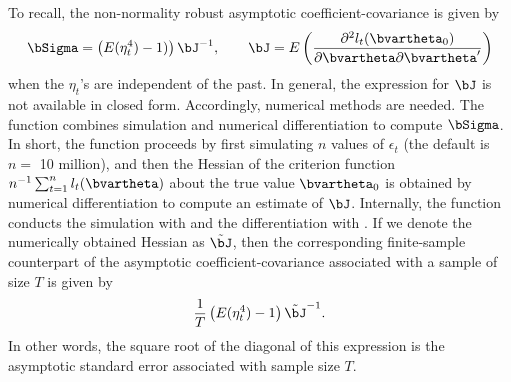 To recall, the non-normality robust asymptotic coefficient-covariance is given by
%
\begin{equation*}
	\bSigma = \left(E(\eta_t^4) - 1)\right) \bJ^{-1}, \qquad \bJ = E\left( \frac{ \partial^2 l_t(\bvartheta_0) }{ \partial\bvartheta\partial\bvartheta' } \right)
\end{equation*}
%
when the $\eta_t$'s are independent of the past. In general, the expression for $\bJ$ is not available in closed form. Accordingly, numerical methods are needed. The  function combines simulation and numerical differentiation to compute $\bSigma$. In short, the function proceeds by first simulating $n$ values of $\epsilon_t$ (the default is $n=$ 10 million), and then the Hessian of the criterion function $n^{-1}\sum_{t=1}^n l_t(\bvartheta)$ about the true value $\bvartheta_0$ is obtained by numerical differentiation to compute an estimate of $\bJ$. Internally, the  function conducts the simulation with  and the differentiation with . If we denote the numerically obtained Hessian as $\tilde{\bJ}$, then the corresponding finite-sample counterpart of the asymptotic coefficient-covariance associated with a sample of size $T$ is given by
%
\begin{equation}
	\frac{1}{T} \left( E(\eta_t^4)-1 \right) \tilde{\bJ}^{-1}.
\end{equation}
%
In other words, the square root of the diagonal of this expression is the asymptotic standard error associated with sample size $T$.

